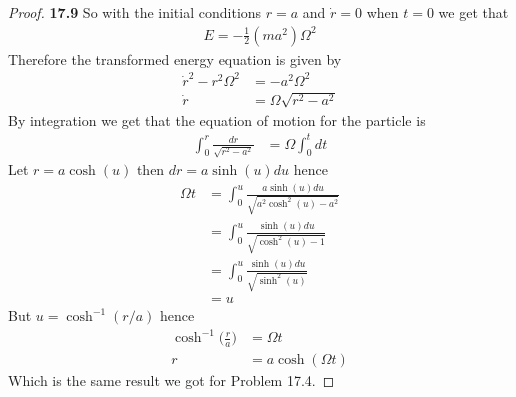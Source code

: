 \documentclass[11pt]{article}
\theoremstyle{definition}
\begin{document}
\begin{proof}{\textbf{17.9}}
    So with the initial conditions $r = a$ and $\dot r = 0$ when $t=0$ we get
    that
    \begin{align*}
        E = - \frac{1}{2}(ma^2)\Omega^2
    \end{align*}
    Therefore the transformed energy equation is given by
    \begin{align*}
        \dot r^2 - r^2\Omega^2 &= - a^2\Omega^2\\
        \dot r &= \Omega\sqrt{r^2 - a^2}
    \end{align*}
    By integration we get that the equation of motion for the particle is 
    \begin{align*}
        \int_0^r \frac{dr}{\sqrt{r^2 - a^2}} &= \Omega \int_0^t dt
    \end{align*}
    Let $r = a \cosh(u)$ then $dr = a\sinh(u) du$ hence
    \begin{align*}
        \Omega t &= \int_0^u \frac{a\sinh(u) du}{\sqrt{a^2\cosh^2(u) - a^2}}\\
        &= \int_0^u \frac{\sinh(u) du}{\sqrt{\cosh^2(u) - 1}}\\
        &= \int_0^u \frac{\sinh(u) du}{\sqrt{\sinh^2(u)}}\\
        &= u
    \end{align*}
    But $u = \cosh^{-1}(r/a)$ hence
    \begin{align*}
        \cosh^{-1}\bigg(\frac{r}{a}\bigg) &= \Omega t\\
        r &= a\cosh(\Omega t)
    \end{align*}
    Which is the same result we got for Problem 17.4.
\end{proof}
\cleardoublepage
\end{document}
